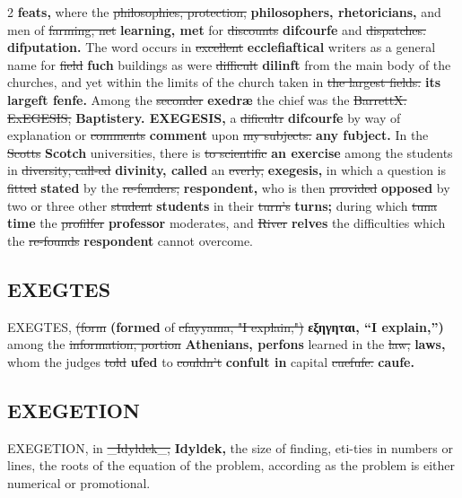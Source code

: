 \documentclass[10pt]{article}
\begin{document}
\begin{multicols}{2}
\textbf{feats,} where the \sout{philosophies, protection,} \textbf{philosophers, rhetoricians,} and men of \sout{farming, net} \textbf{learning, met} for \sout{discounts} \textbf{difcourfe} and \sout{dispatches.} \textbf{difputation.} The word occurs in \sout{excellent} \textbf{ecclefiaftical} writers as a general name for \sout{field} \textbf{fuch} buildings as were \sout{difficult} \textbf{dilinft} from the main body of the churches, and yet within the limits of the church taken in \sout{the largest fields.} \textbf{its largeft fenfe.} Among the \sout{seconder} \textbf{exedræ} the chief was the \sout{BarrettX. ExEGESIS,} \textbf{Baptistery. EXEGESIS,} a \sout{dificultr} \textbf{difcourfe} by way of explanation or \sout{comments} \textbf{comment} upon \sout{my subjects.} \textbf{any fubject.} In the \sout{Scotts} \textbf{Scotch} universities, there is \sout{to scientific} \textbf{an exercise} among the students in \sout{diversity, call-ed} \textbf{divinity, called} an \sout{everly,} \textbf{exegesis,} in which a question is \sout{fitted} \textbf{stated} by the \sout{re-fenders,} \textbf{respondent,} who is then \sout{provided} \textbf{opposed} by two or three other \sout{student} \textbf{students} in their \sout{turn's} \textbf{turns;} during which \sout{tuna} \textbf{time} the \sout{profilfer} \textbf{professor} moderates, and \sout{River} \textbf{relves} the difficulties which the \sout{re-founds} \textbf{respondent} cannot overcome.

\subsection*{EXEGTES}
EXEGTES, \sout{(form} \textbf{(formed} of \sout{cfayyama, "I explain,")} \textbf{εξηγηται, “I explain,”)} among the \sout{information, portion} \textbf{Athenians, perfons} learned in the \sout{law,} \textbf{laws,} whom the judges \sout{told} \textbf{ufed} to \sout{couldn’t} \textbf{confult in} capital \sout{cuefufe.} \textbf{caufe.}

\subsection*{EXEGETION}
EXEGETION, in \sout{\_Idyldek\_,} \textbf{Idyldek,} the size of finding, eti-ties in numbers or lines, the roots of the equation of the problem, according as the problem is either numerical or promotional.


\end{multicols}
\end{document}
